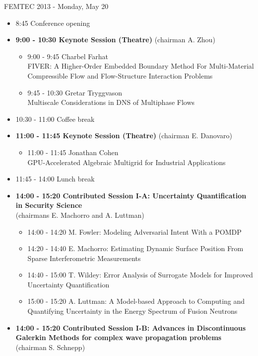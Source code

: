 \documentclass[10pt]{article}%
\begin{document}
\centerline{\huge FEMTEC 2013 - Monday, May 20}
\vspace{4mm}
\pagestyle{fancy}
\begin{itemize}    
  \item 8:45 Conference opening
  \item {\bf 9:00 - 10:30 Keynote Session (Theatre)} (chairman A. Zhou) 
  \begin{itemize}
    \item 9:00 - 9:45 {Charbel Farhat}\\{FIVER: A Higher-Order Embedded Boundary Method For Multi-Material Compressible Flow and Flow-Structure Interaction Problems}
    \item 9:45 - 10:30 {Gretar Tryggvason}\\{Multiscale Considerations in DNS of Multiphase Flows}
  \end{itemize}
  \item 10:30 - 11:00 Coffee break
  \item {\bf 11:00 - 11:45 Keynote Session (Theatre)} (chairman E. Danovaro) 
  \begin{itemize}
    \item 11:00 - 11:45 {Jonathan Cohen}\\{GPU-Accelerated Algebraic Multigrid for Industrial Applications}
  \end{itemize}
  \item 11:45 - 14:00 Lunch break      
  \item {\bf 14:00 - 15:20 Contributed Session I-A: Uncertainty Quantification in Security Science} \\(chairmans E. Machorro and A. Luttman) 
  \begin{itemize}
    \item 14:00 - 14:20 {M. Fowler}: {Modeling Adversarial Intent With a POMDP}
    \item 14:20 - 14:40 {E. Machorro}: {Estimating Dynamic Surface Position From Sparse Interferometric Measurements}
    \item 14:40 - 15:00 {T. Wildey}: {Error Analysis of Surrogate Models for Improved Uncertainty Quantification}
    \item 15:00 - 15:20 {A. Luttman}: {A Model-based Approach to Computing and Quantifying Uncertainty in the Energy Spectrum of Fusion Neutrons}
  \end{itemize}
  \item {\bf 14:00 - 15:20 Contributed Session I-B: Advances in Discontinuous Galerkin Methods for complex wave propagation problems} (chairman S. Schnepp)

\end{itemize}
\end{document}
